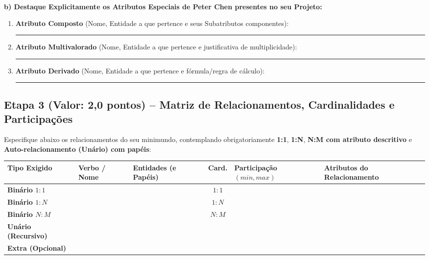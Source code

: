 \documentclass[11pt,a4paper]{article}
\newcommand{\linhaescrita}{\noindent\textcolor{black!40}{\rule{\linewidth}{0.4pt}}\par\vspace{0.28cm}}
\begin{document}
\vspace{0.3cm}
\noindent\textbf{b) Destaque Explicitamente os Atributos Especiais de Peter Chen presentes no seu Projeto:}
\begin{enumerate}[label=\textbf{\arabic*.}, itemsep=4pt]
    \item \textbf{Atributo Composto} (Nome, Entidade a que pertence e seus Subatributos componentes):\\[0.2cm]
    \linhaescrita
    \item \textbf{Atributo Multivalorado} (Nome, Entidade a que pertence e justificativa de multiplicidade):\\[0.2cm]
    \linhaescrita
    \item \textbf{Atributo Derivado} (Nome, Entidade a que pertence e fórmula/regra de cálculo):\\[0.2cm]
    \linhaescrita
\end{enumerate}

\vspace{0.2cm}
\subsection*{Etapa 3 (Valor: 2,0 pontos) -- Matriz de Relacionamentos, Cardinalidades e Participações}

Especifique abaixo os relacionamentos do seu minimundo, contemplando obrigatoriamente \textbf{1:1}, \textbf{1:N}, \textbf{N:M com atributo descritivo} e \textbf{Auto-relacionamento (Unário) com papéis}:

\vspace{0.15cm}
\noindent
{\renewcommand{\arraystretch}{1.9}
\begin{tabularx}{\textwidth}{|p{2.7cm}|p{2.7cm}|p{3.4cm}|c|p{2.4cm}|>{\raggedright\arraybackslash}X|}
\hline
\textbf{Tipo Exigido} & \textbf{Verbo / Nome} & \textbf{Entidades (e Papéis)} & \textbf{Card.} & \textbf{Participação $(min,max)$} & \textbf{Atributos do Relacionamento} \\
\hline
\textbf{Binário $1:1$} & & & $1:1$ & & \\
\hline
\textbf{Binário $1:N$} & & & $1:N$ & & \\
\hline
\textbf{Binário $N:M$} & & & $N:M$ & & \\
\hline
\textbf{Unário (Recursivo)} & & & & & \\
\hline
\textbf{Extra (Opcional)} & & & & & \\
\hline
\end{tabularx}}

\newpage
\end{document}

